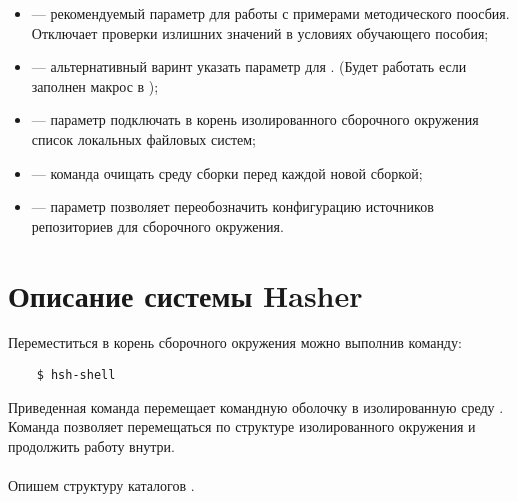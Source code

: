 \begin{itemize}
	\item {} --- рекомендуемый параметр для работы с примерами методического поосбия.
	Отключает проверки излишних значений в условиях обучающего пособия;
	\item {} --- альтернативный варинт указать параметр  для .
	(Будет работать если заполнен макрос   в );
	\item {} --- параметр подключать в корень изолированного сборочного
	окружения список локальных файловых систем;
	\item {} --- команда очищать среду сборки перед каждой новой сборкой;
	\item {} --- параметр позволяет переобозначить конфигурацию источников
	репозиториев для сборочного окружения.
\end{itemize}

\section{Описание системы Hasher}
Переместиться в корень сборочного окружения можно выполнив команду:
\begin{verbatim}
	$ hsh-shell
\end{verbatim}
Приведенная команда перемещает командную оболочку в изолированную среду .
Команда позволяет перемещаться по структуре изолированного окружения и продолжить работу
внутри.\\
\\
Опишем структуру каталогов .

